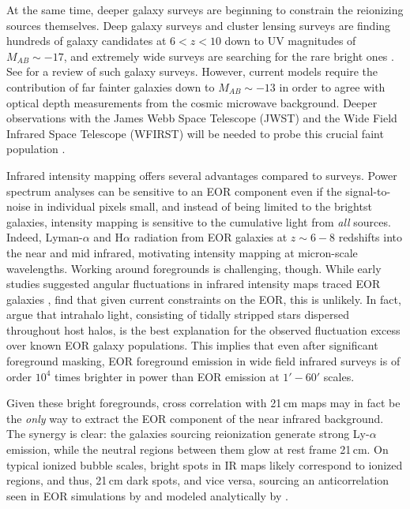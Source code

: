 \documentclass{emulateapj}
\begin{document}
At the same time, deeper galaxy surveys are beginning to constrain the reionizing sources themselves. Deep galaxy surveys \cite{Bowler2017,Roberts-Borsani2016,Bowler2015,Wilkins12015,Bouwens2015,Bouwens2013,Dunlop2013,Illingworth2013,Ellis2013,Robertson2013,Oesch2013,Grogin2011,Bouwens2011} and cluster lensing surveys \cite{Livermore2016,Ebeling2016,McLeod2016,Bouwens2016,Bouwens2016a,Coe2015,Huang2015,McLeod2015,Atek2015} are finding hundreds of galaxy candidates at $6<z<10$ down to UV magnitudes of $M_{AB}\sim-17$, and extremely wide surveys are searching for the rare bright ones \citep{Bernard2016,Calvi,Schmidt2014,Bradley2012,Trenti2011}. See \citet{Finkelstein2015} for a review of such galaxy surveys. However, current models require the contribution of far fainter galaxies down to $M_{AB}\sim-13$ \citep{Robertson2013,Alvarez2012} in order to agree with optical depth measurements \citep{planck16} from the cosmic microwave background. Deeper observations with the James Webb Space Telescope (JWST) \citep{Gardner2006} and the Wide Field Infrared Space Telescope (WFIRST) \citep{Spergel2013} will be needed to probe this crucial faint population \citep{Atek2015}.

Infrared intensity mapping offers several advantages compared to surveys. Power spectrum analyses can be sensitive to an EOR component even if the signal-to-noise in individual pixels small, and instead of being limited to the brightst galaxies, intensity mapping is sensitive to the cumulative light from \textit{all} sources. Indeed, Lyman-$\alpha$ and H$\alpha$ radiation from EOR galaxies at $z\sim6-8$ redshifts into the near and mid infrared, motivating intensity mapping at micron-scale wavelengths. Working around foregrounds is challenging, though. While early studies suggested angular fluctuations in infrared intensity maps traced EOR galaxies \citep[e.g.,][]{kash1,kash2,kash3}, \citet{kash4} find that given current constraints on the EOR, this is unlikely. In fact, \citet{cooray12,zemcov14} argue that intrahalo light, consisting of tidally stripped stars dispersed throughout host halos, is the best explanation for the observed fluctuation excess over known EOR galaxy populations. This implies that even after significant foreground masking, EOR foreground emission in wide field infrared surveys is of order $10^4$ times brighter in power than EOR emission at $1'-60'$ scales.

Given these bright foregrounds, cross correlation with 21\,cm maps may in fact be the \textit{only} way to extract the EOR component of the near infrared background. The synergy is clear: the galaxies sourcing reionization generate strong Ly-$\alpha$ emission, while the neutral regions between them glow at rest frame 21\,cm. On typical ionized bubble scales, bright spots in IR maps likely correspond to ionized regions, and thus, 21\,cm dark spots, and vice versa, sourcing an anticorrelation seen in EOR simulations by \citet{silva12,Heneka2016} and modeled analytically by \citet{feng17,mao14}.
\end{document}
